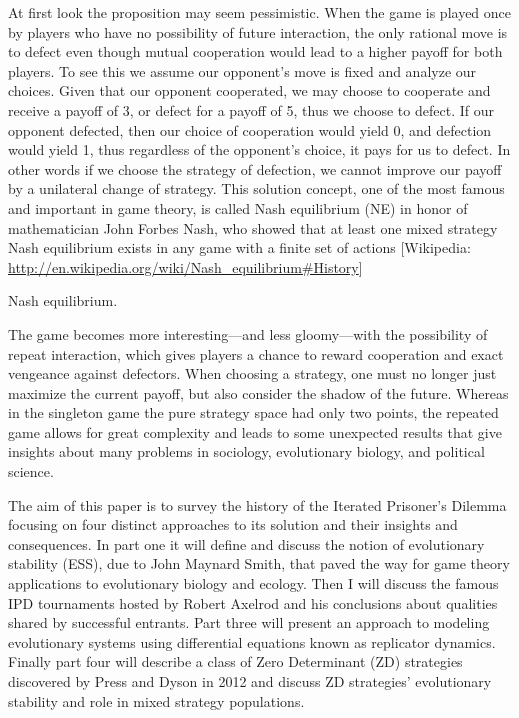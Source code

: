 At first look the proposition may seem pessimistic. When the game is played once by players who have no possibility of future interaction, the only rational move is to defect even though mutual cooperation would lead to a higher payoff for both players. To see this we assume our opponent's move is fixed and analyze our choices. Given that our opponent cooperated, we may choose to cooperate and receive a payoff of 3, or defect for a payoff of 5, thus we choose to defect. If our opponent defected, then our choice of cooperation would yield 0, and defection would yield 1, thus regardless of the opponent's choice, it pays for us to defect. In other words if we choose the strategy of defection, we cannot improve our payoff by a unilateral change of strategy. This solution concept, one of the most famous and important in game theory, is called Nash equilibrium (NE) in honor of mathematician John Forbes Nash, who showed that at least one mixed strategy Nash equilibrium exists in any game with a finite set of actions [Wikipedia: \url{http://en.wikipedia.org/wiki/Nash_equilibrium#History}]
\begin{definition} Nash equilibrium.
\end{definition}

The game becomes more interesting---and less gloomy---with the possibility of repeat interaction, which gives players a chance to reward cooperation and exact vengeance against defectors. When choosing a strategy, one must no longer just maximize the current payoff, but also consider the shadow of the future. Whereas in the singleton game the pure strategy space had only two points, the repeated game allows for great complexity and leads to some unexpected results that give insights about many problems in sociology, evolutionary biology, and political science.

The aim of this paper is to survey the history of the Iterated Prisoner's Dilemma focusing on four distinct approaches to its solution and their insights and consequences. In part one it will define and discuss the notion of evolutionary stability (ESS), due to John Maynard Smith, that paved the way for game theory applications to evolutionary biology and ecology. Then I will discuss the famous IPD tournaments hosted by Robert Axelrod and his conclusions about qualities shared by successful entrants. Part three will present an approach to modeling evolutionary systems using differential equations known as replicator dynamics. Finally part four will describe a class of Zero Determinant (ZD) strategies discovered by Press and Dyson in 2012 and discuss ZD strategies' evolutionary stability and role in mixed strategy populations.


